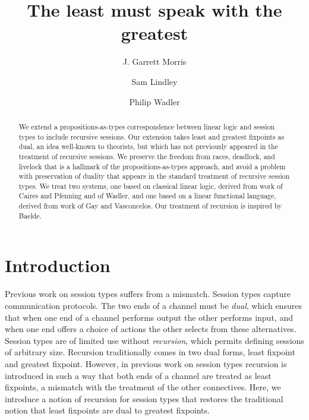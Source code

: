 \documentclass[orivec,envcountsame]{llncs}
\title{The least must speak with the greatest\vspace{-3mm}}
\author{J. Garrett Morris \and Sam Lindley \and Philip Wadler}
\institute{The University of Edinburgh \\
           \email{\{Garrett.Morris,Sam.Lindley,Philip.Wadler\}@ed.ac.uk} \vspace{-5mm}}
\begin{document}
\maketitle

\begin{abstract}
  We extend a propositions-as-types correspondence between linear logic and session types to include
  recursive sessions.  Our extension takes least and greatest fixpoints as dual, an idea well-known
  to theorists, but which has not previously appeared in the treatment of recursive sessions. We
  preserve the freedom from races, deadlock, and livelock that is a hallmark of the
  propositions-as-types approach, and avoid a problem with preservation of duality that appears in
  the standard treatment of recursive session types. We treat two systems, one based on classical
  linear logic, derived from work of Caires and Pfenning and of Wadler, and one based on a linear
  functional language, derived from work of Gay and Vasconcelos. Our treatment of recursion is
  inspired by Baelde.
\end{abstract}

\vspace{-7mm}
\section{Introduction}\label{sec:intro}

Previous work on session types suffers from a mismatch.  Session types capture communication
protocols. The two ends of a channel must be \emph{dual}, which ensures that when one end of a
channel performs output the other performs input, and when one end offers a choice of actions the
other selects from these alternatives. Session types are of limited use without \emph{recursion},
which permits defining sessions of arbitrary size. Recursion traditionally comes in two dual forms,
least fixpoint and greatest fixpoint. However, in previous work on session types recursion is
introduced in such a way that both ends of a channel are treated as least fixpoints, a mismatch with
the treatment of the other connectives. Here, we introduce a notion of recursion for session types
that restores the traditional notion that least fixpoints are dual to greatest fixpoints.
\end{document}

